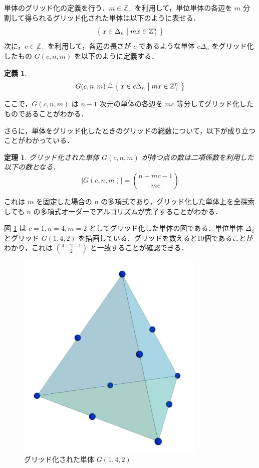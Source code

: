 \documentclass[a4paper,11pt]{jreport}
\newtheorem{definition}{定義}
\newtheorem{theorem}{定理}
\begin{document}
単体のグリッド化の定義を行う．$ m \in \mathbb{Z}_+ $ を利用して，単位単体の各辺を $ m $ 分割して得られるグリッド化された単体は以下のように表せる．
$$ \Set{ x \in \Delta_n | mx \in \mathbb{Z}_+^n } $$
次に，$ c \in \mathbb{Z}_+ $ を利用して，各辺の長さが $ c $ であるような単体 $ c \Delta_n $ をグリッド化したもの $ G(c, n, m) $ を以下のように定義する．

\begin{definition}
$$ G(c, n, m) \triangleq \Set{x \in c \Delta_n | mx \in \mathbb{Z}_+^n} $$
\end{definition}

ここで，$ G(c, n, m) $ は $ n - 1 $ 次元の単体の各辺を $ mc $ 等分してグリッド化したものであることがわかる．\par
さらに，単体をグリッド化したときのグリッドの総数について，以下が成り立つことがわかっている．

\begin{theorem} \label{thm:n_grid}
グリッド化された単体 $ G(c, n, m) $ が持つ点の数は二項係数を利用した以下の数となる．
$$ | G(c, n, m) | = \binom{n + mc - 1}{mc} $$
\end{theorem}

これは $ m $ を固定した場合の $ n $ の多項式であり，グリッド化した単体上を全探索しても $ n $ の多項式オーダーでアルゴリズムが完了することがわかる．\par
図 \ref{fig:grid_simplex} は $ c=1, n=4, m=2 $ としてグリッド化した単体の図である．単位単体 $ \Delta_4 $ とグリッド $ G(1, 4, 2) $ を描画している．グリッドを数えると10個であることがわかり，これは $ \binom{4 + 2 - 1}{2} $ と一致することが確認できる．\par

\begin{figure}
\begin{center}
\includegraphics[width=9cm]{graphs/grid_simplex.pdf}
\caption{グリッド化された単体 $ G(1, 4, 2) $}
\label{fig:grid_simplex}
\end{center}
\end{figure}
\end{document}
